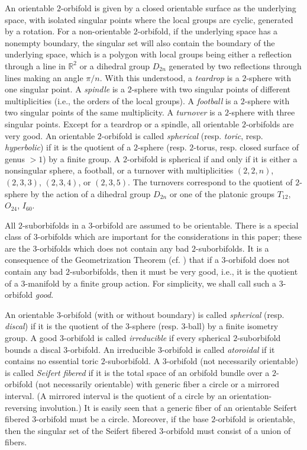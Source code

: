 \documentclass[11pt]{amsart}
\theoremstyle{plain}
\numberwithin{theorem}{section}
\theoremstyle{definition}
\begin{document}
An orientable $2$-orbifold is given by a closed orientable surface as the underlying space, with isolated singular points where the local groups are cyclic, generated by a rotation.  
For a non-orientable $2$-orbifold, if the underlying space has a nonempty boundary, 
the singular set will also contain the boundary of the underlying space, which is a polygon
with local groups being either a reflection through a line in ${{\mathbb R}}^2$ or a dihedral group $D_{2n}$ generated by two reflections through lines making an angle $\pi/n$. With this understood, a 
{\it teardrop} is a $2$-sphere with one singular point. A {\it spindle} is a $2$-sphere with two 
singular points of different multiplicities (i.e., the orders of the local groups). A {\it football}
is a $2$-sphere with two singular points of the same multiplicity. A {\it turnover} is a $2$-sphere with 
three singular points. Except for a teardrop or a spindle, all orientable $2$-orbifolds are very good.
An orientable $2$-orbifold is called {\it spherical} (resp. {\it toric}, resp. {\it hyperbolic}) if it is the quotient of a $2$-sphere (resp. $2$-torus, resp. closed surface of genus $>1$) by a finite group. 
A $2$-orbifold is spherical if and only if it is either a nonsingular sphere, a football, or a turnover with
multiplicities $(2,2,n)$, $(2,3,3)$, $(2,3,4)$, or $(2,3,5)$. The turnovers correspond to the quotient of 
$2$-sphere by the action of a dihedral group $D_{2n}$ or one of the platonic groups $T_{12}$, $O_{24}$, $I_{60}$. 

All $2$-suborbifolds in a $3$-orbifold are assumed to be orientable.  
There is a special class of $3$-orbifolds which are important for the considerations in this paper;
these are the $3$-orbifolds which does not contain any bad $2$-suborbifolds. It is a consequence of
the Geometrization Theorem (cf. \cite{BLP, MM}) that if a $3$-orbifold does not contain any bad 
$2$-suborbifolds, then it must be very good, i.e., it is the quotient of a $3$-manifold by a finite group 
action. For simplicity, we shall call such a $3$-orbifold {\it good}. 

An orientable $3$-orbifold (with or without boundary) is called {\it spherical} (resp. {\it discal}) if it is the quotient of the $3$-sphere (resp. $3$-ball) by a finite isometry group.  A good $3$-orbifold is called {\it irreducible} if every spherical $2$-suborbifold bounds a discal $3$-orbifold. An irreducible $3$-orbifold is called {\it atoroidal} if it contains no essential toric $2$-suborbifold. A $3$-orbifold (not necessarily 
orientable) is called {\it Seifert fibered} if it is the total space of an orbifold bundle over a $2$-orbifold (not necessarily orientable) with generic fiber a circle or a mirrored interval. (A mirrored interval is the quotient of a circle by an orientation-reversing involution.) It is easily seen that a generic fiber of an orientable Seifert fibered $3$-orbifold must be a circle. Moreover, if the base $2$-orbifold is orientable, then the singular set 
of the Seifert fibered $3$-orbifold must consist of a union of fibers. 
\end{document}

